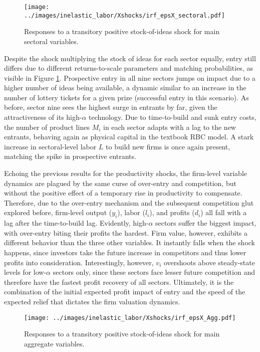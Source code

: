 \documentclass[a4paper,12pt]{article} %
\numberwithin{equation}{section} %
\numberwithin{figure}{section}
\numberwithin{table}{section}
\begin{document}
\begin{figure}[H]
  \centering
  \texttt{[image: ../images/inelastic\_labor/Xshocks/irf\_epsX\_sectoral.pdf]}
  \caption{Responses to a transitory positive stock-of-ideas shock for main sectoral variables.}
  \label{fig:multistock}
\end{figure}

Despite the shock multiplying the stock of ideas for each sector equally, entry still differs due to different returns-to-scale parameters
and matching probabilities, as visible in Figure \ref{fig:multistock}. Prospective entry in all nine sectors jumps on impact due to a higher
number of ideas being available, a dynamic similar to an increase in the number of lottery tickets for a given prize (successful entry in
this scenario). As before, sector nine sees the highest surge in entrants by far, given the attractiveness of its high-$\alpha$ technology.
Due to time-to-build and sunk entry costs, the number of product lines $M_i$ in each sector adapts with a lag to the new entrants, behaving
again as physical capital in the textbook RBC model. A stark increase in sectoral-level labor $L$ to build new firms is once again present,
matching the spike in prospective entrants.

Echoing the previous results for the productivity shocks, the firm-level variable dynamics are plagued by the same curse of over-entry
and competition, but without the positive effect of a temporary rise in productivity to compensate. Therefore, due to the over-entry mechanism
and the subsequent competition glut explored before, firm-level output ($y_i$), labor ($l_i$), and profits ($d_i$) all fall with a lag after the
time-to-build lag. Evidently, high-$\alpha$ sectors suffer the biggest impact, with over-entry biting their profits the hardest. Firm value,
however, exhibits a different behavior than the three other variables. It instantly falls when the shock happens, since investors take the future
increase in competitors and thus lower profits into consideration. Interestingly, however, $v_i$ overshoots above steady-state levels for low-$\alpha$
sectors only, since these sectors face lesser future competition and therefore have the fastest profit recovery of all sectors. Ultimately, it is
the combination of the initial expected profit impact of entry and the speed of the expected relief that dictates the firm valuation dynamics.

\begin{figure}[H]
  \centering
  \texttt{[image: ../images/inelastic\_labor/Xshocks/irf\_epsX\_Agg.pdf]}
  \caption{Responses to a transitory positive stock-of-ideas shock for main aggregate variables.}
  \label{fig:aggstock}
\end{figure}
\end{document}
